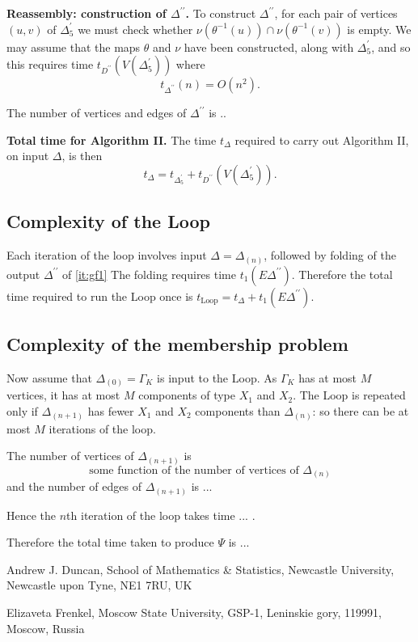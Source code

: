 \documentclass[a4paper,12pt]{article}
\newcommand{\G}{\Gamma }
\newcommand{\D}{\Delta }
\numberwithin{equation}{section}
\numberwithin{figure}{section}
\newcommand{\Loop}{\operatorname{Loop}}
\begin{document}
{\bf Reassembly: construction of $\D^{\prime\prime}$.}
To construct $\D^{\prime\prime}$,
for each
pair of vertices $(u,v)$ of $\D^\prime_5$ we must check whether
$\nu(\theta^{-1}(u))\cap\nu(\theta^{-1}(v))$ is empty. We may assume that
the maps $\theta$ and $\nu$ have been constructed, along with $\D^\prime_5$,
and so this requires time $t_{D^{\prime\prime}}(V(\D^\prime_5))$ where
\begin{equation}\label{eq:D''}
t_{\D^{\prime\prime}}(n)=O(n^2).
\end{equation}

The number of vertices and edges of $\D^{\prime\prime}$ is ..

{\bf Total time for Algorithm II.}
The time $t_{\D}$ required to carry out   Algorithm II, on input $\D$, is then
 \begin{equation}\label{eq:alg2}
t_{\D}=t_{\D^\prime_5}+t_{D^{\prime\prime}}(V(\D^\prime_5)).
\end{equation}



\subsection{Complexity of the Loop}\label{sub:loop}
Each iteration of the loop involves input $\D=\D_{(n)}$, followed by
folding of the output $\D^{\prime\prime}$ of \ref{it:gf1}
The folding requires time $t_1(E\D^{\prime\prime})$. Therefore the
total time required to run the Loop once is
 $t_{\Loop}= t_{\D}+t_1(E\D^{\prime\prime})$.


\subsection{Complexity of the membership problem}\label{sub:mp_complexity}

Now assume that $\D_{(0)}=\G_K$ is input to the Loop. As $\G_K$ has at
most $M$ vertices, it has at most $M$  components of type $X_1$ and $X_2$.
 The Loop  is repeated
 only if $\D_{(n+1)}$ has fewer  $X_1$ and $X_2$ components
than $\D_{(n)}$: so there can be at most $M$ iterations of the loop.

The number of vertices of $\D_{(n+1)}$ is
\[\textrm{some function of the number of vertices of } \D_{(n)}\]
and the number of edges of     $\D_{(n+1)}$ is ...

Hence the $n$th iteration of the loop takes time ... .

Therefore the total time taken to produce $\Psi$ is ...





\medskip



\noindent \textsf{Andrew J. Duncan, School of Mathematics \&
Statistics, Newcastle University, Newcastle upon Tyne, NE1 7RU,
UK}



\noindent \textsf{Elizaveta Frenkel, Moscow State University,
GSP-1, Leninskie gory, 119991, Moscow, Russia}

\end{document}
